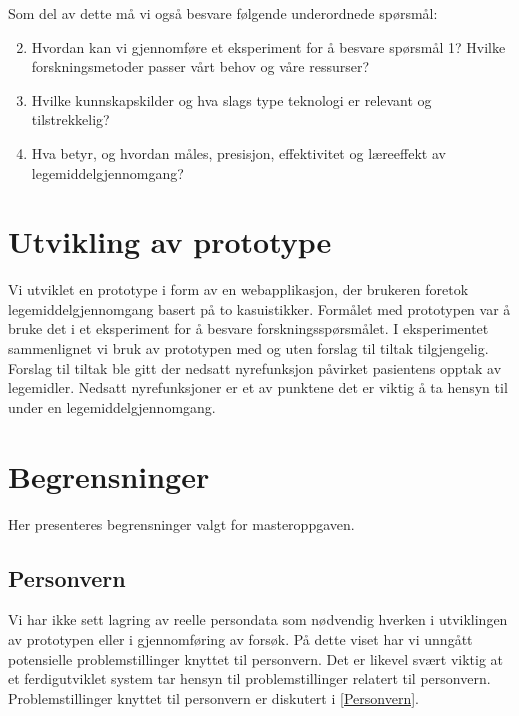 Som del av dette må vi også besvare følgende underordnede spørsmål:
\begin{enumerate}
\setcounter{enumi}{1}
\item Hvordan kan vi gjennomføre et eksperiment for å besvare spørsmål 1? Hvilke forskningsmetoder passer vårt behov og våre ressurser?
\item Hvilke kunnskapskilder og hva slags type teknologi er relevant og tilstrekkelig?
\item Hva betyr, og hvordan måles, presisjon, effektivitet og læreeffekt av legemiddelgjennomgang?
\end{enumerate}
\section{Utvikling av prototype}
Vi utviklet en prototype i form av en webapplikasjon, der brukeren foretok legemiddelgjennomgang basert på to kasuistikker. Formålet med prototypen var å bruke det i et eksperiment for å besvare forskningsspørsmålet. I eksperimentet sammenlignet vi bruk av prototypen med og uten forslag til tiltak tilgjengelig. Forslag til tiltak ble gitt der nedsatt nyrefunksjon påvirket pasientens opptak av legemidler. Nedsatt nyrefunksjoner er et av punktene det er viktig å ta hensyn til under en legemiddelgjennomgang\citep{Helsedirektoratet_veileder_LMG}. 




\section{Begrensninger}
Her presenteres begrensninger valgt for masteroppgaven.
\subsection{Personvern}
Vi har ikke sett lagring av reelle persondata som nødvendig hverken i utviklingen av prototypen eller i gjennomføring av forsøk. På dette viset har vi unngått potensielle problemstillinger knyttet til personvern. Det er likevel svært viktig at et ferdigutviklet system tar hensyn til problemstillinger relatert til personvern. Problemstillinger knyttet til personvern er diskutert i \ref{Personvern}.

 